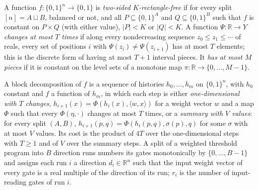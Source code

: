 \begin{definition}
  \label{def:lowerbounds-threshold-rectangle-changes}
  \leanok
  A function $f:\{0,1\}^n\to\{0,1\}$ is \emph{two-sided $K$-rectangle-free} if for
  every split $[n]=A\sqcup B$, balanced or not, and all $P\subseteq\{0,1\}^A$ and
  $Q\subseteq\{0,1\}^B$ such that $f$ is constant on $P\times Q$ (with either
  value), $|P|<K$ or $|Q|<K$. A function $\Psi:\mathbb{R}\to Y$ \emph{changes at
  most $T$ times} if along every nondecreasing sequence $z_0\le z_1\le\cdots$ of
  reals, every set of positions $i$ with $\Psi(z_i)\ne\Psi(z_{i+1})$ has at most $T$
  elements; this is the discrete form of having at most $T+1$ interval pieces. It
  \emph{has at most $M$ pieces} if it is constant on the level sets of a monotone
  map $\pi:\mathbb{R}\to\{0,\dots,M-1\}$.
\end{definition}

\begin{definition}
  \label{def:lowerbounds-threshold-blocks}
  \leanok
  A block decomposition of $f$ is a sequence of histories $h_0,\dots,h_m$ on
  $\{0,1\}^n$, with $h_0$ constant and $f$ a function of $h_m$, in which each step
  is either \emph{one-dimensional with $T$ changes},
  $h_{i+1}(x)=\Phi(h_i(x),\langle w,x\rangle)$ for a weight vector $w$ and a map
  $\Phi$ such that every $\Phi(\eta,\cdot)$ changes at most $T$ times, or a
  \emph{summary with $V$ values}: for every split $(A,B)$,
  $h_{i+1}(p,q)=\Phi(h_i(p,q),\sigma(p),q)$ for some $\sigma$ with at most $V$
  values. Its cost is the product of $4T$ over the one-dimensional steps with
  $T\ge1$ and of $V$ over the summary steps. A split of a weighted threshold
  program into $B$ direction runs numbers its gates monotonically by
  $\{0,\dots,B-1\}$ and assigns each run $i$ a direction $d_i\in\mathbb{R}^n$ such
  that the input weight vector of every gate is a real multiple of the direction
  of its run; $r_i$ is the number of input-reading gates of run $i$.
\end{definition}


